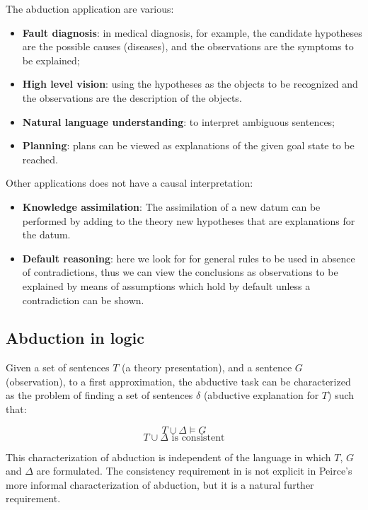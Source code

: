 The abduction application are various:
\begin{itemize}
    \item \textbf{Fault diagnosis}: 
        in medical diagnosis, for example, the candidate hypotheses are the possible causes (diseases), 
        and the observations are the symptoms to be explained;
    \item \textbf{High level vision}: using the hypotheses as the objects to be recognized and the observations are the description of the objects.
    \item \textbf{Natural language understanding}: to interpret ambiguous sentences;
    \item \textbf{Planning}: plans can be viewed as explanations of the given goal state to be reached.
\end{itemize}

Other applications does not have a causal interpretation:

\begin{itemize}
    \item \textbf{Knowledge assimilation}: 
        The assimilation of a new datum can be performed by adding to the theory new hypotheses that are explanations for the datum.
    \item \textbf{Default reasoning}: here we look for for general rules to be used in absence of contradictions, 
    thus we can view the conclusions as observations to be explained by means of assumptions which hold by default unless a contradiction can be shown.
\end{itemize}

\subsection{Abduction in logic}

Given a set of sentences \(T\) (a theory presentation), and a sentence \(G\) (observation), to a first approximation, 
the abductive task can be characterized as the problem of finding a set of sentences \(\delta\) (abductive explanation for \(T\)) such that:

\begin{equation}
 T \cup \Delta \vDash G
 \label{eqn:abl1}
\end{equation}
\begin{equation}
 T \cup \Delta \text{ is consistent}
 \label{eqn:abl2}
\end{equation}

This characterization of abduction is independent of the language in which \(T\), \(G\) and $\Delta$ are formulated. 
The consistency requirement in  is not explicit in Peirce's more informal characterization of abduction, but it is a natural further requirement.


